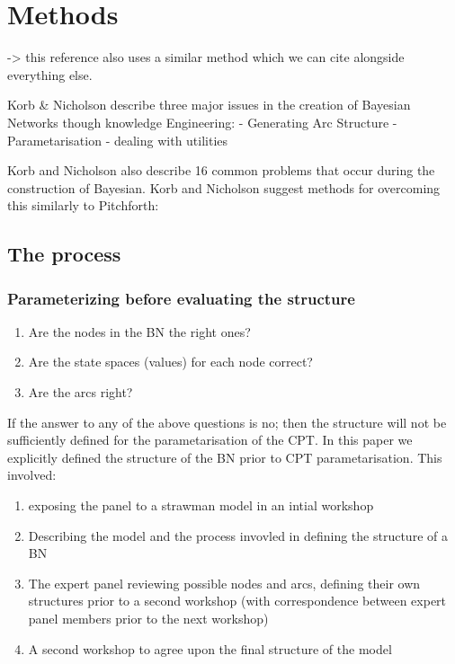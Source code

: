 \section{Methods}
\citep{mayfieldDesigningExpertledBayesian2023} -> this reference also uses a similar method which we can cite alongside everything else.

\citep{korbBayesianArtificialIntelligence2011} Korb & Nicholson describe three major issues in the creation of Bayesian Networks though knowledge Engineering:
- Generating Arc Structure
- Parametarisation
- dealing with utilities

Korb and Nicholson also describe 16 common problems that occur during the construction of Bayesian. Korb and Nicholson suggest methods for overcoming this similarly to Pitchforth:
\subsection{The process}
\subsubsection{Parameterizing before evaluating the structure}
\begin{enumerate}
        \item Are the nodes in the BN the right ones?
        \item Are the state spaces (values) for each node correct?
        \item Are the arcs right?
\end{enumerate}
If the answer to any of the above questions is no; then the structure will not be sufficiently defined for the parametarisation of the CPT. In this paper we explicitly defined the structure of the BN prior to CPT parametarisation. This involved:
\begin{enumerate}
        \item exposing the panel to a strawman model in an intial workshop
        \item Describing the model and the process invovled in defining the structure of a BN
        \item The expert panel reviewing possible nodes and arcs, defining their own structures prior to a second workshop (with correspondence between expert panel members prior to the next workshop)
        \item A second workshop to agree upon the final structure of the model
\end{enumerate}
